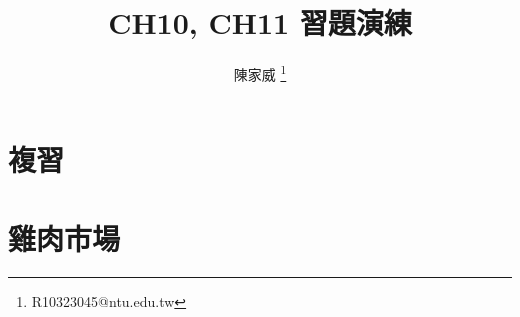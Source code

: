 \documentclass[mathserif]{beamer}
\title{CH10, CH11 習題演練}
\author{陳家威 \thanks{R10323045@ntu.edu.tw}}
\begin{document}
    \begin{frame}
        \maketitle
    \end{frame}

    \section{複習}
    

    \section{雞肉市場}
    
    
\end{document}
